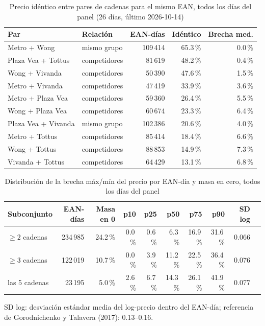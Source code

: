 
\begin{table}[htbp]
\caption{Precio id\'entico entre pares de cadenas para el mismo EAN, todos los d\'ias del panel (26 d\'ias, \'ultimo 2026-10-14)}
\label{tab:identidad}
\centering\scriptsize\setlength{\tabcolsep}{3pt}
\begin{tabular}{@{}llrrr@{}}
\toprule
Par & Relaci\'on & EAN-d\'ias & Id\'entico & Brecha med. \\
\midrule
Metro + Wong & mismo grupo & 109\,414 & 65.3\,\% & 0.0\,\% \\
Plaza Vea + Tottus & competidores & 81\,619 & 48.2\,\% & 0.4\,\% \\
Wong + Vivanda & competidores & 50\,390 & 47.6\,\% & 1.5\,\% \\
Metro + Vivanda & competidores & 47\,419 & 33.9\,\% & 3.6\,\% \\
Metro + Plaza Vea & competidores & 59\,360 & 26.4\,\% & 5.5\,\% \\
Wong + Plaza Vea & competidores & 60\,674 & 23.3\,\% & 6.4\,\% \\
Plaza Vea + Vivanda & mismo grupo & 102\,386 & 20.6\,\% & 4.0\,\% \\
Metro + Tottus & competidores & 85\,414 & 18.4\,\% & 6.6\,\% \\
Wong + Tottus & competidores & 88\,853 & 14.9\,\% & 7.3\,\% \\
Vivanda + Tottus & competidores & 64\,429 & 13.1\,\% & 6.8\,\% \\
\bottomrule\end{tabular}\end{table}

\begin{table}[t]
\caption{Distribuci\'on de la brecha m\'ax/m\'in del precio por EAN-d\'ia y masa en cero, todos los d\'ias del panel}
\label{tab:brecha}
\centering\scriptsize\setlength{\tabcolsep}{4pt}
\begin{tabular}{@{}lrrrrrrrrr@{}}
\toprule
Subconjunto & EAN-d\'ias & Masa en 0 & p10 & p25 & p50 & p75 & p90 & SD log \\
\midrule
$\geq 2$ cadenas & 234\,985 & 24.2\,\% & 0.0\,\% & 0.6\,\% & 6.3\,\% & 16.9\,\% & 31.6\,\% & 0.066 \\
$\geq 3$ cadenas & 122\,019 & 10.7\,\% & 0.0\,\% & 3.9\,\% & 11.2\,\% & 22.5\,\% & 36.4\,\% & 0.076 \\
las 5 cadenas & 23\,195 & 5.0\,\% & 2.6\,\% & 6.7\,\% & 14.3\,\% & 26.1\,\% & 41.9\,\% & 0.077 \\
\bottomrule\end{tabular}
\par\smallskip\raggedright\scriptsize SD log: desviaci\'on est\'andar media del log-precio dentro del EAN-d\'ia; referencia de Gorodnichenko y Talavera (2017): 0.13--0.16.
\end{table}

